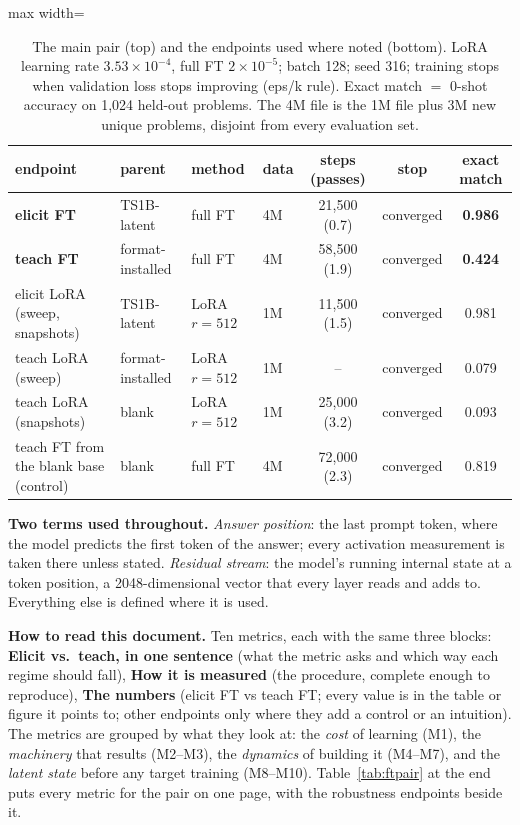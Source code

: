 \documentclass[11pt]{article}
\begin{document}
\begin{table}[h]\centering\small
\begin{adjustbox}{max width=\textwidth}
\begin{tabular}{llllccc}
\toprule
endpoint & parent & method & data & steps (passes) & stop & exact match \\
\midrule
\textbf{elicit FT} & TS1B-latent & full FT & 4M & 21{,}500 (0.7) & converged & \textbf{0.986} \\
\textbf{teach FT} & format-installed & full FT & 4M & 58{,}500 (1.9) & converged & \textbf{0.424} \\
\midrule
elicit LoRA (sweep, snapshots) & TS1B-latent & LoRA $r{=}512$ & 1M & 11{,}500 (1.5) & converged & 0.981 \\
teach LoRA (sweep) & format-installed & LoRA $r{=}512$ & 1M & -- & converged & 0.079 \\
teach LoRA (snapshots) & blank & LoRA $r{=}512$ & 1M & 25{,}000 (3.2) & converged & 0.093 \\
teach FT from the blank base (control) & blank & full FT & 4M & 72{,}000 (2.3) & converged & 0.819 \\
\bottomrule
\end{tabular}
\end{adjustbox}
\caption{The main pair (top) and the endpoints used where noted (bottom). LoRA learning rate
$3.53{\times}10^{-4}$, full FT $2{\times}10^{-5}$; batch 128; seed 316; training stops when
validation loss stops improving (eps/k rule). Exact match $=$ 0-shot accuracy on 1,024 held-out
problems. The 4M file is the 1M file plus 3M new unique problems, disjoint from every evaluation
set.}
\label{tab:endpoints}
\end{table}

\noindent\textbf{Two terms used throughout.} \emph{Answer position}: the last prompt token, where
the model predicts the first token of the answer; every activation measurement is taken there
unless stated. \emph{Residual stream}: the model's running internal state at a token position, a
2048-dimensional vector that every layer reads and adds to. Everything else is defined where it
is used.

\noindent\textbf{How to read this document.} Ten metrics, each with the same three blocks:
\textbf{Elicit vs.\ teach, in one sentence} (what the metric asks and which way each regime
should fall), \textbf{How it is measured} (the procedure, complete enough to reproduce),
\textbf{The numbers} (elicit FT vs teach FT; every value is in the table or figure it points
to; other endpoints only where they add a control or an intuition). The metrics are grouped
by what they look at: the \emph{cost} of learning (M1), the \emph{machinery} that results
(M2--M3), the \emph{dynamics} of building it (M4--M7), and the \emph{latent state} before any
target training (M8--M10). Table~\ref{tab:ftpair} at the end puts every metric for the pair on one
page, with the robustness endpoints beside it.
\end{document}
